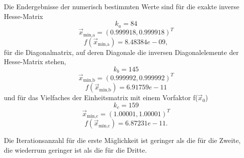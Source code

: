   Die Endergebnisse der numerisch bestimmten Werte sind für die  exakte inverse Hesse-Matrix
  $$k_a = 84 $$
  $$ \vec{x}_\text{min,a}= (0.999918 , 0.999918)^T $$
  $$f(\vec{x}_\text{min,a})=8.48384e-09, $$
  für die Diagonalmatrix, auf deren Diagonale die inversen Diagonalelemente der Hesse-Matrix stehen,
  $$k_b= 145$$
  $$\vec{x}_\text{min,b}=(0.999992 , 0.999992)^T$$
  $$f(\vec{x}_\text{min,b})=6.91759e-11$$
  und für das Vielfaches der Einheitsmatrix mit einem Vorfaktor f($\vec{x}_0$)
  $$k_c= 159$$
  $$\vec{x}_\text{min,c}=(1.00001 , 1.00001)^T$$
  $$ f(\vec{x}_\text{min,c})=6.87231e-11.$$

  Die Iterationsanzahl für die erste Mäglichkeit ist geringer als die für die Zweite, die wiederrum geringer ist als die für die Dritte.
  
